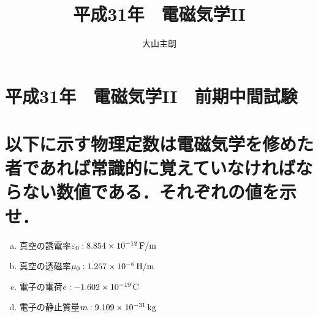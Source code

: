 \documentclass[dvipdfmx]{ujarticle}
\begin{document}
\title{平成31年　電磁気学II}
\date{}
\author{大山主朗}

\maketitle

\section*{平成31年　電磁気学II　前期中間試験}

\section{以下に示す物理定数は電磁気学を修めた者であれば常識的に覚えていなければならない数値である．それぞれの値を示せ．}
\begin{enumerate}[(a)]
	\item 真空の誘電率$\varepsilon_{0}:8.854 \times 10^{-12}\,\rm{F/m}$
	\item 真空の透磁率$\mu_{0}:1.257 \times 10^{-6}\,\rm{H/m}$
	\item 電子の電荷$e:-1.602 \times 10^{-19}\,\rm{C}$
	\item 電子の静止質量$m:9.109\times 10^{-31}\,\rm{kg}$
\end{enumerate}
\end{document}
